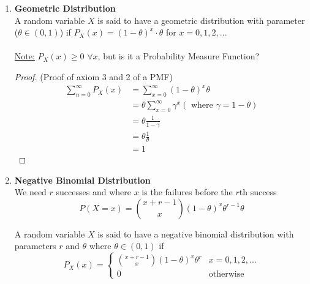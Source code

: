 \documentclass[12pt, twoside]{article}
\begin{document}
\begin{enumerate}
{\begin{proof}
	(Proof of (2.) in Note)\\
	\begin{align*}
		\sum_{x=0}^n P_X (x) &= \sum_{x=0}^n \binom{n}{x} \theta^x (1-\theta)^{n-x}\\
		&= (\theta + 1 - \theta)^n = 1^n = 1
	\end{align*}
	\underline{Recall that} $$(a+b)^n = \sum_{x=0}^n a^x b^{n-x}$$
\end{proof}
	
	}
	\item{
	\textbf{Geometric Distribution}\\
	A random variable $X$ is said to have a geometric distribution with parameter ($\theta \in (0,1)$) if $P_X (x) = (1 - \theta)^x \cdot \theta$ for $x = 0,1,2,...$\\
	\\
	\underline{Note:} $P_X (x) \geq 0$ $\forall x$, but is it a Probability Measure Function?\\
	\begin{proof}
	(Proof of axiom 3 and 2 of a PMF)\\
	\begin{align*}
		\sum_{n=0}^{\infty} P_X (x) &= \sum_{x=0}^{\infty} (1 - \theta)^x \theta\\
		&= \theta \sum_{x=0}^{\infty} \gamma^x (\text{ where } \gamma = 1 - \theta)\\
		&= \theta \frac{1}{1 - \gamma}\\
		&=\theta \frac{1}{\theta}\\
		&= 1
	\end{align*}
	\end{proof}
	}
	\item{
	\textbf{Negative Binomial Distribution}\\
	We need $r$ successes and where $x$ is the failures before the $r$th success
	$$P(X = x) = \binom{x+r - 1}{x} (1 - \theta)^x \theta^{r-1} \theta$$
	
	A random variable $X$ is said to have a negative binomial distribution with parameters $r$ and $\theta$ where $\theta \in (0,1)$ if\\
	$$P_X (x) = 
	\begin{cases}
		\binom{x+r - 1}{x} (1 - \theta)^x \theta^{r} & x = 0,1,2,...\\
		0 & \text{otherwise}
	\end{cases}$$
	}
\end{enumerate}

\newpage
\end{document}
